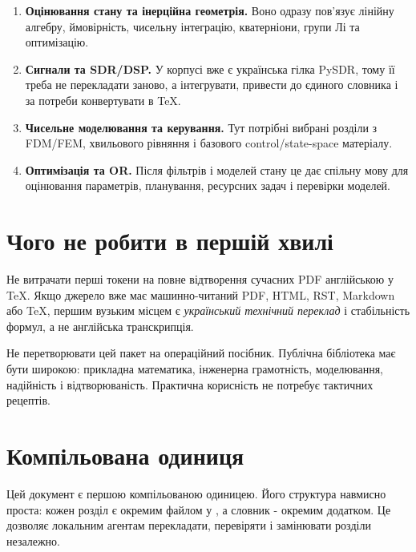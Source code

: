 \begin{enumerate}[label=\arabic*.]
  \item \textbf{Оцінювання стану та інерційна геометрія.} Воно одразу пов'язує лінійну алгебру, ймовірність, чисельну інтеграцію, кватерніони, групи Лі та оптимізацію.
  \item \textbf{Сигнали та SDR/DSP.} У корпусі вже є українська гілка PySDR, тому її треба не перекладати заново, а інтегрувати, привести до єдиного словника і за потреби конвертувати в TeX.
  \item \textbf{Чисельне моделювання та керування.} Тут потрібні вибрані розділи з FDM/FEM, хвильового рівняння і базового control/state-space матеріалу.
  \item \textbf{Оптимізація та OR.} Після фільтрів і моделей стану це дає спільну мову для оцінювання параметрів, планування, ресурсних задач і перевірки моделей.
\end{enumerate}

\section{Чого не робити в першій хвилі}

Не витрачати перші токени на повне відтворення сучасних PDF англійською у TeX. Якщо джерело вже має машинно-читаний PDF, HTML, RST, Markdown або TeX, першим вузьким місцем є \emph{український технічний переклад} і стабільність формул, а не англійська транскрипція.

Не перетворювати цей пакет на операційний посібник. Публічна бібліотека має бути широкою: прикладна математика, інженерна грамотність, моделювання, надійність і відтворюваність. Практична корисність не потребує тактичних рецептів.

\section{Компільована одиниця}

Цей документ є першою компільованою одиницею. Його структура навмисно проста: кожен розділ є окремим файлом у , а словник - окремим додатком. Це дозволяє локальним агентам перекладати, перевіряти і замінювати розділи незалежно.

